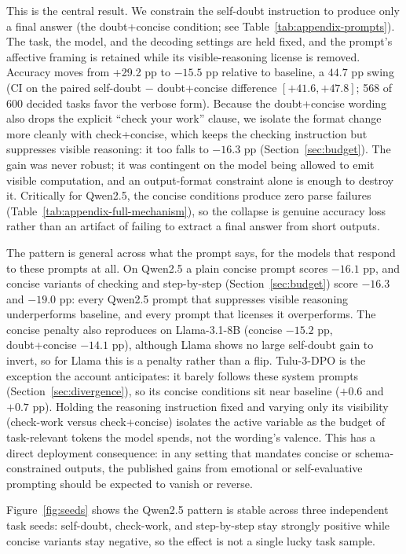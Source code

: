 \documentclass{article}
\begin{document}
This is the central result. We constrain the self-doubt instruction to produce only a final answer (the doubt+concise condition; see Table~\ref{tab:appendix-prompts}). The task, the model, and the decoding settings are held fixed, and the prompt's affective framing is retained while its visible-reasoning license is removed. Accuracy moves from +29.2 pp to $-15.5$ pp relative to baseline, a $44.7$ pp swing (CI on the paired self-doubt $-$ doubt+concise difference $[+41.6,+47.8]$; 568 of 600 decided tasks favor the verbose form). Because the doubt+concise wording also drops the explicit ``check your work'' clause, we isolate the format change more cleanly with check+concise, which keeps the checking instruction but suppresses visible reasoning: it too falls to $-16.3$ pp (Section~\ref{sec:budget}). The gain was never robust; it was contingent on the model being allowed to emit visible computation, and an output-format constraint alone is enough to destroy it. Critically for Qwen2.5, the concise conditions produce zero parse failures (Table~\ref{tab:appendix-full-mechanism}), so the collapse is genuine accuracy loss rather than an artifact of failing to extract a final answer from short outputs.

The pattern is general across what the prompt says, for the models that respond to these prompts at all. On Qwen2.5 a plain concise prompt scores $-16.1$ pp, and concise variants of checking and step-by-step (Section~\ref{sec:budget}) score $-16.3$ and $-19.0$ pp: every Qwen2.5 prompt that suppresses visible reasoning underperforms baseline, and every prompt that licenses it overperforms. The concise penalty also reproduces on Llama-3.1-8B (concise $-15.2$ pp, doubt+concise $-14.1$ pp), although Llama shows no large self-doubt gain to invert, so for Llama this is a penalty rather than a flip. Tulu-3-DPO is the exception the account anticipates: it barely follows these system prompts (Section~\ref{sec:divergence}), so its concise conditions sit near baseline ($+0.6$ and $+0.7$ pp). Holding the reasoning instruction fixed and varying only its visibility (check-work versus check+concise) isolates the active variable as the budget of task-relevant tokens the model spends, not the wording's valence. This has a direct deployment consequence: in any setting that mandates concise or schema-constrained outputs, the published gains from emotional or self-evaluative prompting should be expected to vanish or reverse.

Figure~\ref{fig:seeds} shows the Qwen2.5 pattern is stable across three independent task seeds: self-doubt, check-work, and step-by-step stay strongly positive while concise variants stay negative, so the effect is not a single lucky task sample.
\end{document}
